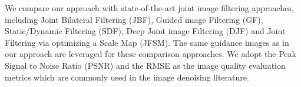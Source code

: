 \documentclass{article}
\begin{document}
We compare our approach with state-of-the-art joint image filtering approaches, including Joint Bilateral Filtering (JBF)\cite{kopf2007joint}, Guided image Filtering (GF)\cite{he2013guided}, Static/Dynamic Filtering (SDF)\cite{ham2017robust}, Deep Joint image Filtering (DJF)\cite{li2016deep} and Joint Filtering via optimizing a Scale Map (JFSM)\cite{shen2015multispectral}. The same guidance images as in our approach are leveraged for these comparison approaches.
We adopt the Peak Signal to Noise Ratio (PSNR) and the RMSE as the image quality evaluation metrics which are commonly used in the image denoising literature. 
\end{document}

